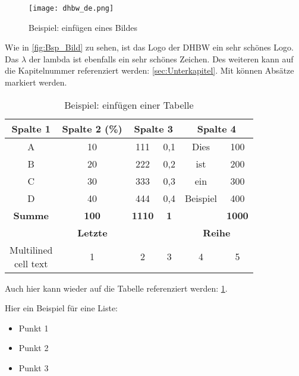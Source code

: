 \begin{figure}[h]
    \centering
    \texttt{[image: dhbw\_de.png]}
    \caption{Beispiel: einfügen eines Bildes \cite{Mustermann2023}}
    \label{fig:Bsp_Bild}
\end{figure}

Wie in \autoref{fig:Bsp_Bild} zu sehen, ist das Logo der \ac{DHBW} ein sehr schönes Logo. Das $\lambda$ der \ac{lambda} ist ebenfalls ein sehr schönes Zeichen. Des weiteren kann auf die Kapitelnummer referenziert werden: \autoref{sec:Unterkapitel}. Mit  können Absätze markiert werden.


\vspace{0.5cm}
\begin{table}[h]
    \centering
    \begin{tabular}[c]{|c|c|c|c|c|c|}
        \hline
            \rowcolor{lightgray} 
            \textbf{Spalte 1} & 
            \textbf{Spalte 2 (\%)} &  
            \multicolumn{2}{|c|}{\textbf{Spalte 3}} & 
            \multicolumn{2}{|c|}{\textbf{Spalte 4}}\\
        \hline
            A &     10 &    111 &   0,1 &   Dies &      100 \\
        \hline
            B &     20 &    222 &   0,2 &   ist &       200 \\
        \hline
            C &     30 &    333 &   0,3 &   ein &       300 \\
        \hline
            D &     40 &    444 &   0,4 &   Beispiel &  400 \\
        \hline
            \textbf{Summe} &
            \textbf{100} &
            \textbf{1110} &
            \textbf{1} &  &
            \textbf{1000}\\
        \hline
            \multicolumn{4}{|c|}{\textbf{Letzte}} & 
            \multicolumn{2}{|c|}{\textbf{Reihe}} \\
        \hline
            \makecell{Multilined \\ cell text} & 1 & 2 & 3 & 4 & 5 \\
        \hline
    \end{tabular}
    \caption{Beispiel: einfügen einer Tabelle}
    \label{tab:Bsp_Tabelle}
\end{table}

Auch hier kann wieder auf die Tabelle referenziert werden: \ref{tab:Bsp_Tabelle}.


\vspace{0.5cm}
Hier ein Beispiel für eine Liste:
\begin{itemize}[label=\textbullet]
    \item Punkt 1
    \item Punkt 2
    \item Punkt 3
\end{itemize}